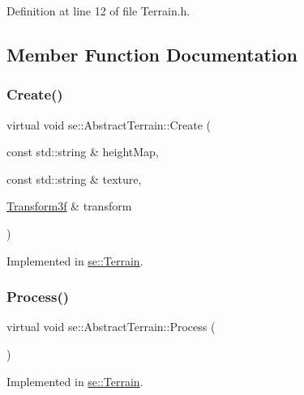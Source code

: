 Definition at line 12 of file Terrain.\+h.



\subsection{Member Function Documentation}
\mbox{\label{classse_1_1_abstract_terrain_ab064ca434de133a78a0899fe53caea99}} 
\subsubsection{\texorpdfstring{Create()}{Create()}}
{\footnotesize\ttfamily virtual void se\+::\+Abstract\+Terrain\+::\+Create (\begin{DoxyParamCaption}\item[{const std\+::string \&}]{height\+Map,  }\item[{const std\+::string \&}]{texture,  }\item[{\mbox{\hyperlink{classse_1_1_transform3f}{Transform3f}} \&}]{transform }\end{DoxyParamCaption})\hspace{0.3cm}{\ttfamily [pure virtual]}}



Implemented in \mbox{\hyperlink{classse_1_1_terrain_a67309f26fbbf361cc38d2e7e62264648}{se\+::\+Terrain}}.

\mbox{\label{classse_1_1_abstract_terrain_af2f0249eead2b62a82baa2ecbb52efeb}} 
\subsubsection{\texorpdfstring{Process()}{Process()}}
{\footnotesize\ttfamily virtual void se\+::\+Abstract\+Terrain\+::\+Process (\begin{DoxyParamCaption}{ }\end{DoxyParamCaption})\hspace{0.3cm}{\ttfamily [pure virtual]}}



Implemented in \mbox{\hyperlink{classse_1_1_terrain_aa4eeb1886f46d2f33e1633b6f7c7345c}{se\+::\+Terrain}}.

